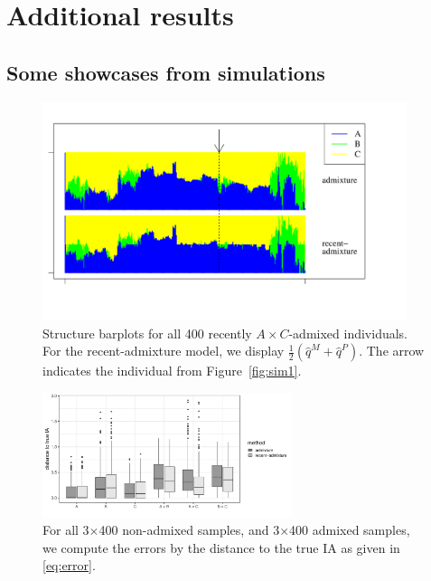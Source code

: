 \documentclass[12pt]{article}
\theoremstyle{definition}
\begin{document}
\newpage

\section{Additional results}

\subsection{Some showcases from simulations}
\enlargethispage{0cm}
\begin{figure}[H]
  \begin{center}
    \parbox[b]{0.9\textwidth}{\includegraphics[width=0.95\textwidth]{abc_StructurePlot.pdf}\vspace{-2cm}}
  \end{center}
  \caption{\label{Sfig:sim2} Structure barplots for all 400 recently
    $A\times C$-admixed individuals. For the recent-admixture model, we display $\tfrac 12(\widehat q^M + \widehat q^P)$. The arrow indicates the
    individual from Figure~\ref{fig:sim1}.}
\end{figure}

\begin{figure}[H]
  \begin{center}
    \parbox[b]{0.5\textwidth}{\includegraphics[width=0.65\textwidth]{deviations_abc.pdf}\vspace{0cm}}
  \end{center}
  \caption{\label{Sfig:sim3} For all 3$\times$400 non-admixed samples,
    and 3$\times$400 admixed samples, we compute the errors by the
    distance to the true IA as given in \eqref{eq:error}.}
\end{figure}
\end{document}

